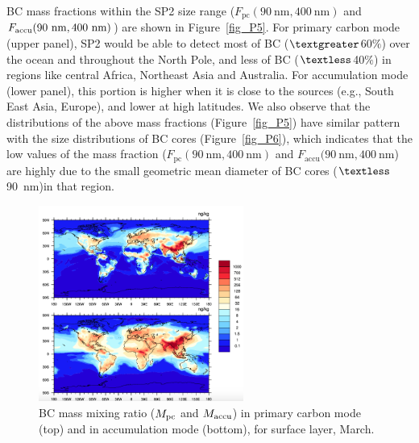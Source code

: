 \documentclass[11pt]{article}
\begin{document}
	BC mass fractions within the SP2 size range ($F_{\text{pc}}(90~\text{nm}, 400~\text{nm})$ and
	$F_{\text{accu}}(90~\rm nm, 400~\rm nm)$) are shown in Figure~\ref{fig_P5}. For primary carbon mode
	(upper panel), SP2 would be able to detect most of BC ($\textgreater$60$\%$) over the ocean and throughout the North Pole, and less of BC ($\textless$40$\%$) in regions like central Africa, Northeast Asia and Australia. For accumulation mode (lower panel), this portion is higher when it is close to the sources (e.g., South East Asia, Europe), and lower at high latitudes. We also observe that the distributions of the above mass fractions (Figure~\ref{fig_P5}) have similar pattern with the size distributions of BC cores (Figure~\ref{fig_P6}), which indicates that the low values of the mass fraction ($F_{\text{pc}}(90~\text{nm}, 400~\text{nm})$ and $F_{\text{accu}}(90~\text{nm}, 400~\text{nm}$) are highly due to the small geometric mean diameter of BC cores ($\textless$90~nm)in that region.
	\begin{figure}[!h] 
		\begin{center}
			\includegraphics[width = 0.6\textwidth]{Rplot01}
			\caption[]{\label{fig_P4}BC mass mixing ratio ($M_{\rm pc}$ and $M_{\rm accu}$) in primary carbon mode (top) and in accumulation mode (bottom), for surface layer, March.}
		\end{center}
	\end{figure}
	
\end{document}

